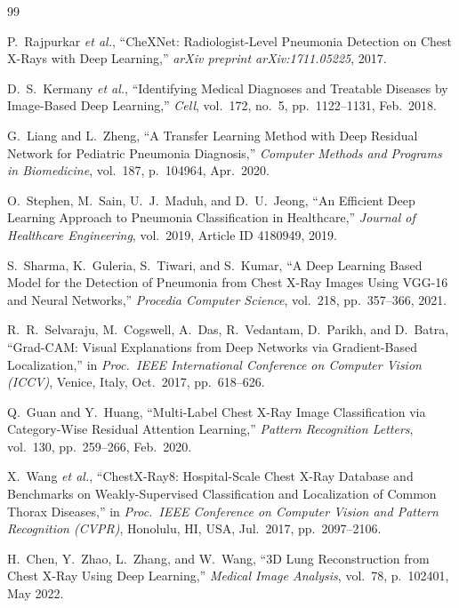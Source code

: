 \documentclass[conference]{IEEEtran}
\begin{document}

\begin{thebibliography}{99}

P.~Rajpurkar \textit{et al.}, ``CheXNet: Radiologist-Level Pneumonia Detection on Chest X-Rays with Deep Learning,'' \emph{arXiv preprint arXiv:1711.05225}, 2017.

D.~S.~Kermany \textit{et al.}, ``Identifying Medical Diagnoses and Treatable Diseases by Image-Based Deep Learning,'' \emph{Cell}, vol.~172, no.~5, pp.~1122--1131, Feb.\ 2018.

G.~Liang and L.~Zheng, ``A Transfer Learning Method with Deep Residual Network for Pediatric Pneumonia Diagnosis,'' \emph{Computer Methods and Programs in Biomedicine}, vol.~187, p.~104964, Apr.\ 2020.

O.~Stephen, M.~Sain, U.~J.~Maduh, and D.~U.~Jeong, ``An Efficient Deep Learning Approach to Pneumonia Classification in Healthcare,'' \emph{Journal of Healthcare Engineering}, vol.~2019, Article ID 4180949, 2019.

S.~Sharma, K.~Guleria, S.~Tiwari, and S.~Kumar, ``A Deep Learning Based Model for the Detection of Pneumonia from Chest X-Ray Images Using VGG-16 and Neural Networks,'' \emph{Procedia Computer Science}, vol.~218, pp.~357--366, 2021.

R.~R.~Selvaraju, M.~Cogswell, A.~Das, R.~Vedantam, D.~Parikh, and D.~Batra, ``Grad-CAM: Visual Explanations from Deep Networks via Gradient-Based Localization,'' in \emph{Proc.\ IEEE International Conference on Computer Vision (ICCV)}, Venice, Italy, Oct.\ 2017, pp.~618--626.

Q.~Guan and Y.~Huang, ``Multi-Label Chest X-Ray Image Classification via Category-Wise Residual Attention Learning,'' \emph{Pattern Recognition Letters}, vol.~130, pp.~259--266, Feb.\ 2020.

X.~Wang \textit{et al.}, ``ChestX-Ray8: Hospital-Scale Chest X-Ray Database and Benchmarks on Weakly-Supervised Classification and Localization of Common Thorax Diseases,'' in \emph{Proc.\ IEEE Conference on Computer Vision and Pattern Recognition (CVPR)}, Honolulu, HI, USA, Jul.\ 2017, pp.~2097--2106.

H.~Chen, Y.~Zhao, L.~Zhang, and W.~Wang, ``3D Lung Reconstruction from Chest X-Ray Using Deep Learning,'' \emph{Medical Image Analysis}, vol.~78, p.~102401, May 2022.


\end{thebibliography}
\end{document}
